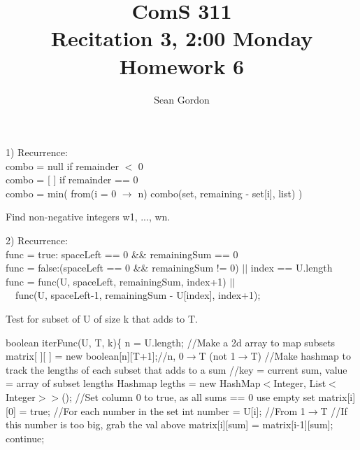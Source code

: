 \documentclass[12pt]{article}
\title{ComS 311\\Recitation 3, 2:00 Monday\\Homework 6}
\author{Sean Gordon}
\begin{document}
\maketitle


1) Recurrence: \\
combo = null if remainder $<$ 0\\
combo = [ ] if remainder == 0\\
combo = min( from(i = 0 $\to$ n) {combo(set, remaining - set[i], list)} )\\


\begin{algorithm}[H]
\caption{Find non-negative integers w1, ..., wn.}
\begin{algorithmic} [1]

\State 

\end{algorithmic}
\end{algorithm}


\pagebreak


2) Recurrence: \\
func =  true: spaceLeft == 0 \&\& remainingSum == 0\\
func = false:(spaceLeft == 0 \&\& remainingSum != 0) $||$ index == U.length\\
func = func(U, spaceLeft, remainingSum, index+1) $||$\\
\indent \indent \ \ func(U, spaceLeft-1, remainingSum - U[index], index+1);\\


\begin{algorithm}[H]
\caption{Test for subset of U of size k that adds to T.}
\begin{algorithmic} [1]
\State boolean iterFunc(U, T, k)\{
\State
\State n = U.length;
\State 
\State //Make a 2d array to map subsets
\State matrix[ ][ ] = new boolean[n][T+1];\indent //n, 0$\to$T (not 1$\to$T)
\State 
\State //Make hashmap to track the lengths of each subset that adds to a sum
\State //key = current sum, value = array of subset lengths
\State Hashmap legths = new HashMap$<$Integer, List$<$Integer$>>$();
\State 
\State //Set column 0 to true, as all sums == 0 use empty set
\State matrix[i][0] = true;
\EndFor
\State 
\State //For each number in the set
\State int number = U[i];
\State 
\State //From 1$\to$T
\State//If this number is too big, grab the val above
\State matrix[i][sum] = matrix[i-1][sum];
\State continue;
\EndIf
\State

\end{algorithmic}
\end{algorithm}
\end{document}
